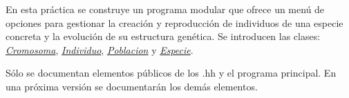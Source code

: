 En esta práctica se construye un programa modular que ofrece un menú de opciones para gestionar la creación y reproducción de individuos de una especie concreta y la evolución de su estructura genética. Se introducen las clases\+: {\itshape \hyperlink{class_cromosoma}{Cromosoma}}, {\itshape \hyperlink{class_individuo}{Individuo}}, {\itshape \hyperlink{class_poblacion}{Poblacion}} y {\itshape \hyperlink{class_especie}{Especie}}.

Sólo se documentan elementos públicos de los .hh y el programa principal. En una próxima versión se documentarán los demás elementos. 